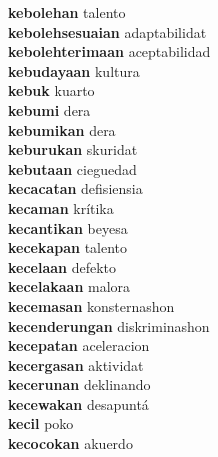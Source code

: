 \textbf{kebolehan } talento \\
\textbf{kebolehsesuaian } adaptabilidat \\
\textbf{kebolehterimaan } aceptabilidad \\
\textbf{kebudayaan } kultura \\
\textbf{kebuk } kuarto \\
\textbf{kebumi } dera \\
\textbf{kebumikan } dera \\
\textbf{keburukan } skuridat \\
\textbf{kebutaan } cieguedad \\
\textbf{kecacatan } defisiensia \\
\textbf{kecaman } krítika \\
\textbf{kecantikan } beyesa \\
\textbf{kecekapan } talento \\
\textbf{kecelaan } defekto \\
\textbf{kecelakaan } malora \\
\textbf{kecemasan } konsternashon \\
\textbf{kecenderungan } diskriminashon \\
\textbf{kecepatan } aceleracion \\
\textbf{kecergasan } aktividat \\
\textbf{kecerunan } deklinando \\
\textbf{kecewakan } desapuntá \\
\textbf{kecil } poko \\
\textbf{kecocokan } akuerdo \\
